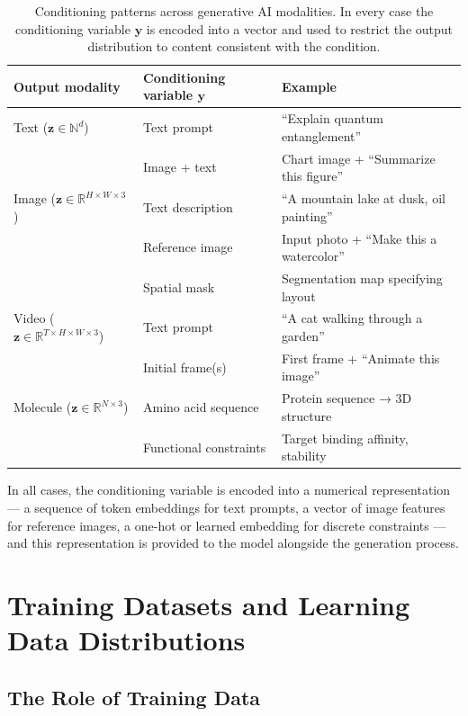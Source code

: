 \documentclass{book}
\begin{document}
\begin{table}[htbp]
\centering
\caption{Conditioning patterns across generative AI modalities. In every case
the conditioning variable $\mathbf{y}$ is encoded into a vector and used to
restrict the output distribution to content consistent with the condition.}
\label{tab:conditioning}
\begin{tabular}{lll}
\hline
\textbf{Output modality} & \textbf{Conditioning variable $\mathbf{y}$} &
\textbf{Example} \\
\hline
Text ($\mathbf{z} \in \mathbb{N}^d$)
    & Text prompt
    & ``Explain quantum entanglement'' \\
    & Image + text
    & Chart image + ``Summarize this figure'' \\
\hline
Image ($\mathbf{z} \in \mathbb{R}^{H \times W \times 3}$)
    & Text description
    & ``A mountain lake at dusk, oil painting'' \\
    & Reference image
    & Input photo + ``Make this a watercolor'' \\
    & Spatial mask
    & Segmentation map specifying layout \\
\hline
Video ($\mathbf{z} \in \mathbb{R}^{T \times H \times W \times 3}$)
    & Text prompt
    & ``A cat walking through a garden'' \\
    & Initial frame(s)
    & First frame + ``Animate this image'' \\
\hline
Molecule ($\mathbf{z} \in \mathbb{R}^{N \times 3}$)
    & Amino acid sequence
    & Protein sequence → 3D structure \\
    & Functional constraints
    & Target binding affinity, stability \\
\hline
\end{tabular}
\end{table}

In all cases, the conditioning variable is encoded into a numerical
representation --- a sequence of token embeddings for text prompts, a vector of
image features for reference images, a one-hot or learned embedding for discrete
constraints --- and this representation is provided to the model alongside the
generation process.

\section{Training Datasets and Learning Data Distributions}

\subsection{The Role of Training Data}
\end{document}
